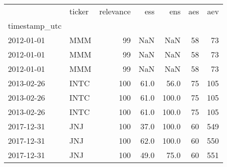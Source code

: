 \begin{tabular}{llrrrrr}
\toprule
{} & ticker &  relevance &   ess &    ens &  aes &  aev \\
timestamp\_utc &        &            &       &        &      &      \\
\midrule
2012-01-01    &    MMM &         99 &   NaN &    NaN &   58 &   73 \\
2012-01-01    &    MMM &         99 &   NaN &    NaN &   58 &   73 \\
2012-01-01    &    MMM &         99 &   NaN &    NaN &   58 &   73 \\
2013-02-26    &   INTC &        100 &  61.0 &   56.0 &   75 &  105 \\
2013-02-26    &   INTC &        100 &  61.0 &  100.0 &   75 &  105 \\
2013-02-26    &   INTC &        100 &  61.0 &  100.0 &   75 &  105 \\
2017-12-31    &    JNJ &        100 &  37.0 &  100.0 &   60 &  549 \\
2017-12-31    &    JNJ &        100 &  62.0 &  100.0 &   60 &  550 \\
2017-12-31    &    JNJ &        100 &  49.0 &   75.0 &   60 &  551 \\
\bottomrule
\end{tabular}
